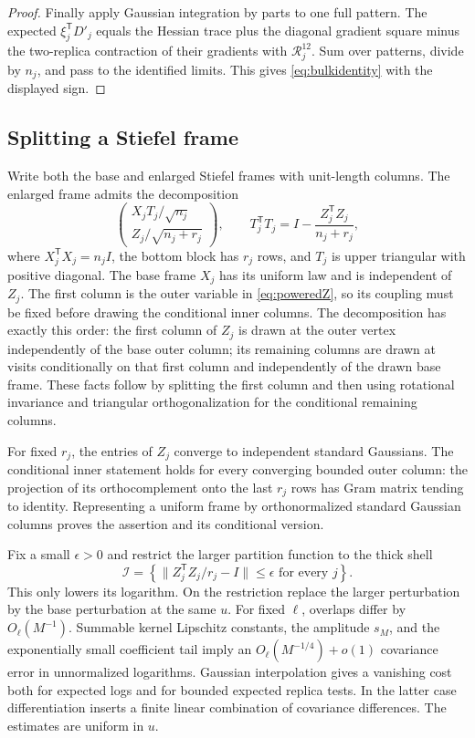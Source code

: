 \documentclass[11pt]{article}
\numberwithin{equation}{section}
\theoremstyle{definition}
\newcommand{\norm}[1]{\lVert #1\rVert}
\begin{document}
\begin{proof}
Finally apply Gaussian integration by parts to one full pattern. The expected $\xi_j^{\mathsf T}D'_j$ equals the Hessian trace plus the diagonal gradient square minus the two-replica contraction of their gradients with $\mathcal R_j^{12}$. Sum over patterns, divide by $n_j$, and pass to the identified limits. This gives \eqref{eq:bulkidentity} with the displayed sign.
\end{proof}

\subsection{Splitting a Stiefel frame}
Write both the base and enlarged Stiefel frames with unit-length columns. The enlarged frame admits the decomposition
\begin{equation}\label{eq:framesplit}
\begin{pmatrix}
X_jT_j/\sqrt{n_j}\\ Z_j/\sqrt{n_j+r_j}
\end{pmatrix},\qquad
T_j^{\mathsf T}T_j=I-\frac{Z_j^{\mathsf T}Z_j}{n_j+r_j},
\end{equation}
where $X_j^{\mathsf T}X_j=n_jI$, the bottom block has $r_j$ rows, and $T_j$ is upper triangular with positive diagonal. The base frame $X_j$ has its uniform law and is independent of $Z_j$. The first column is the outer variable in \eqref{eq:poweredZ}, so its coupling must be fixed before drawing the conditional inner columns. The decomposition has exactly this order: the first column of $Z_j$ is drawn at the outer vertex independently of the base outer column; its remaining columns are drawn at visits conditionally on that first column and independently of the drawn base frame. These facts follow by splitting the first column and then using rotational invariance and triangular orthogonalization for the conditional remaining columns.

For fixed $r_j$, the entries of $Z_j$ converge to independent standard Gaussians. The conditional inner statement holds for every converging bounded outer column: the projection of its orthocomplement onto the last $r_j$ rows has Gram matrix tending to identity. Representing a uniform frame by orthonormalized standard Gaussian columns proves the assertion and its conditional version.

Fix a small $\epsilon>0$ and restrict the larger partition function to the thick shell
\begin{equation}\label{eq:shell}
\mathcal I=\left\{\norm{Z_j^{\mathsf T}Z_j/r_j-I}\le\epsilon
\text{ for every }j\right\}.
\end{equation}
This only lowers its logarithm. On the restriction replace the larger perturbation by the base perturbation at the same $u$. For fixed $\ell$, overlaps differ by $O_\ell(M^{-1})$. Summable kernel Lipschitz constants, the amplitude $s_M$, and the exponentially small coefficient tail imply an $O_\ell(M^{-1/4})+o(1)$ covariance error in unnormalized logarithms. Gaussian interpolation gives a vanishing cost both for expected logs and for bounded expected replica tests. In the latter case differentiation inserts a finite linear combination of covariance differences. The estimates are uniform in $u$.
\end{document}
